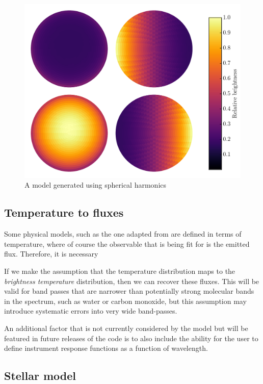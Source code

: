 \documentclass[a4paper,fleqn,usenatbib]{mnras}
\begin{document}
\begin{figure}
\begin{center}
\includegraphics[width=\columnwidth]{img/sphere_quad.pdf}
\caption{A model generated using spherical harmonics}
\label{fig:harmonics}
\end{center}
\end{figure}

\subsection{Temperature to fluxes}\label{sec:ttof}

Some physical models, such as the one adapted from \citep{Zhang2016} are defined in terms of temperature, where of course the observable that is being fit for is the emitted flux. Therefore, it is necessary

If we make the assumption that the temperature distribution maps to the \emph{brightness temperature} distribution, then we can recover these fluxes. This will be valid for band passes that are narrower than potentially strong molecular bands in the spectrum, such as water or carbon monoxide, but this assumption may introduce systematic errors into very wide band-passes.

An additional factor that is not currently considered by the model but will be featured in future releases of the code is to also include the ability for the user to define instrument response functions as a function of wavelength.

\subsection{Stellar model}\label{sec:stellar model}
\end{document}
